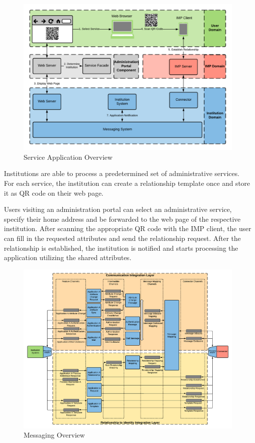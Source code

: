 \begin{figure}[H]
    \centering
    \includegraphics[scale=0.6]{Diagrams/Integration Architecture 2/Technological Integration/3. Application Overview.pdf}
    \caption{Service Application Overview}
    \label{integration2:application_overview}
\end{figure}

Institutions are able to process a predetermined set of administrative services. For each service, the institution can create a relationship template once and store it as QR code on their web page. 

Users visiting an administration portal can select an administrative service, specify their home address and be forwarded to the web page of the respective institution. After scanning the appropriate QR code with the IMP client, the user can fill in the requested attributes and send the relationship request. After the relationship is established, the institution is notified and starts processing the application utilizing the shared attributes.

\begin{figure}[H]
    \centering
    \includegraphics[scale=0.45]{Diagrams/Integration Architecture 2/Technological Integration/2. Messaging Overview.pdf}
    \caption{Messaging Overview}
    \label{integration2:messaging_overview}
\end{figure}

